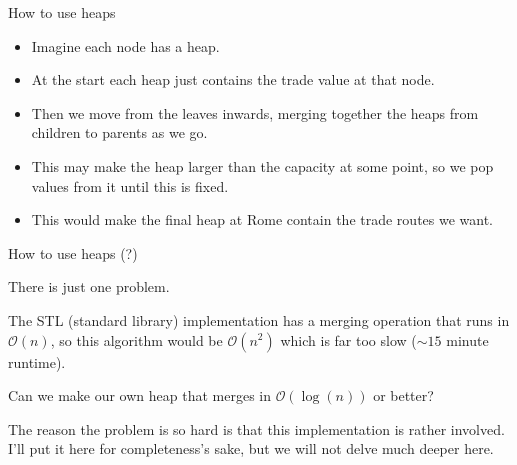 \documentclass{beamer}
\begin{document}
\begin{frame}[plain]{How to use heaps}
    \begin{itemize}
        \item Imagine each node has a heap.
        \item At the start each heap just contains the trade value at that node.
        \item Then we move from the leaves inwards, merging together the heaps from children to parents as we go.
        \item This may make the heap larger than the capacity at some point, so we pop values from it until this is fixed.
        \item This would make the final heap at Rome contain the trade routes we want.
    \end{itemize}
\end{frame}

\begin{frame}[plain]{How to use heaps (?)}
    \begin{itemize}
        \item There is just one problem.
        \item The STL (standard library) implementation has a merging operation that runs in $\mathcal{O}(n)$, so this algorithm would be $\mathcal{O}(n^2)$ which is far too slow ($\sim 15$ minute runtime).
        \item Can we make our own heap that merges in $\mathcal{O}(\log(n))$ or better?
         { \item The reason the problem is so hard is that this implementation is rather involved. I'll put it here for completeness's sake, but we will not delve much deeper here. }
    \end{itemize}
\end{frame}
\end{document}
